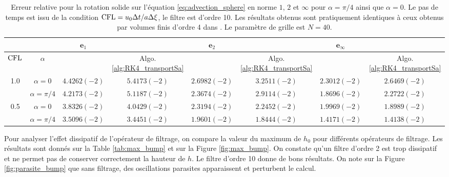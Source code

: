 \begin{table}[htbp]
\begin{center}
\begin{tabular}{|cc||cc||cc||cc|}
\hline 
 & & $\mathbf{e}_1$ &   & $\mathbf{e}_2$ &   & $\mathbf{e}_{\infty}$ &   \\ 
\hline 
$\text{CFL}$ & $\alpha$ & \cite{Ullrich2010} & Algo. \ref{alg:RK4_transportSa} & \cite{Ullrich2010} & Algo. \ref{alg:RK4_transportSa} & \cite{Ullrich2010} & Algo. \ref{alg:RK4_transportSa} \\ 
\hline 
1.0 & $\alpha = 0$ & $4.4262(-2)$ & $5.4173(-2)$ & $2.6982(-2)$ & $3.2511(-2)$ & $2.3012(-2)$ & $2.6469(-2)$ \\ 

  & $\alpha = \pi / 4$ & $4.2173(-2)$ & $5.1187(-2)$ & $2.3674(-2)$ & $2.9114(-2)$ & $1.8696(-2)$ & $2.2722(-2)$ \\ 
\hline 
0.5 & $\alpha = 0$ & $3.8326(-2)$ & $4.0429(-2)$ & $2.3194(-2)$ & $2.2452(-2)$ & $1.9969(-2)$ & $1.8989(-2)$ \\ 

  & $\alpha = \pi/4$ & $3.5096(-2)$ & $3.4451(-2)$ & $1.9601(-2)$ & $1.8444(-2)$ & $1.4171(-2)$ & $1.4138(-2)$ \\ 
\hline 
\end{tabular} 
\end{center}
\caption{Erreur relative pour la rotation solide sur l'équation \eqref{eq:advection_sphere} en norme $1$, $2$ et $\infty$ pour $\alpha = \pi / 4$ ainsi que $\alpha=0$. Le pas de temps est issu de la condition $\text{CFL} = u_0 \Delta t / a \Delta \xi$, le filtre est d'ordre 10. Les résultats obtenus sont pratiquement identiques à ceux obtenus par volumes finis d'ordre 4 dans \cite{Ullrich2010}. Le paramètre de grille est $N=40$.}
\label{tab:comp_ullrich_bump}
\end{table} 

Pour analyser l'effet dissipatif de l'opérateur de filtrage, on compare la valeur du maximum de $h_0$ pour différents opérateurs de filtrage. Les résultats sont donnés sur la Table \ref{tab:max_bump} et sur la Figure \ref{fig:max_bump}. On constate qu'un filtre d'ordre 2 est trop dissipatif et ne permet pas de conserver correctement la hauteur de $h$. Le filtre d'ordre 10 donne de bons résultats. On note sur la Figure \ref{fig:parasite_bump} que sans filtrage, des oscillations parasites apparaissent et perturbent le calcul.

